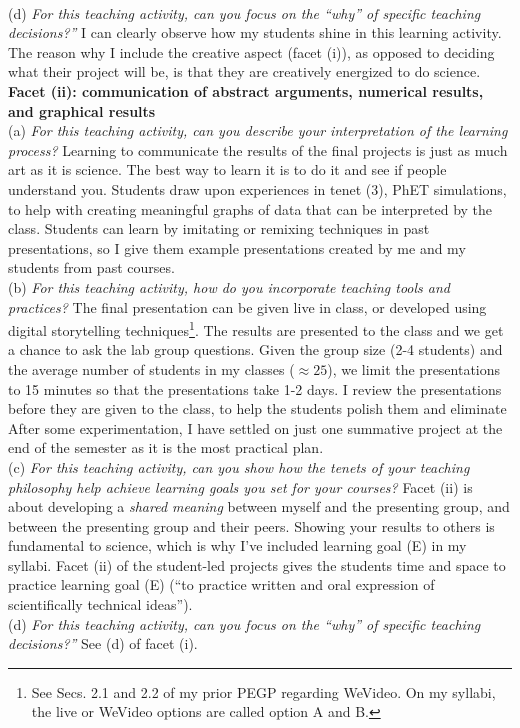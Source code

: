 \documentclass[../../../main.tex]{subfiles}
\begin{document}
\\
\vspace{0.15cm}
(d) \textit{For this teaching activity, can you focus on the ``why'' of specific teaching decisions?''}  I can clearly observe how my students shine in this learning activity.  The reason why I include the creative aspect (facet (i)), as opposed to deciding what their project will be, is that they are creatively energized to do science.
\\
\vspace{0.15cm}
\textbf{Facet (ii): communication of abstract arguments, numerical results, and graphical results}
\\
\vspace{0.15cm}
(a) \textit{For this teaching activity, can you describe your interpretation of the learning process?}  Learning to communicate the results of the final projects is just as much art as it is science.  The best way to learn it is to do it and see if people understand you.  Students draw upon experiences in tenet (3), PhET simulations, to help with creating meaningful graphs of data that can be interpreted by the class.  Students can learn by imitating or remixing techniques in past presentations, so I give them example presentations created by me and my students from past courses.
\\
\vspace{0.15cm}
(b) \textit{For this teaching activity, how do you incorporate teaching tools and practices?}  The final presentation can be given live in class, or developed using digital storytelling techniques\footnote{See Secs. 2.1 and 2.2 of my prior PEGP regarding WeVideo.  On my syllabi, the live or WeVideo options are called option A and B.}.  The results are presented to the class and we get a chance to ask the lab group questions.  Given the group size (2-4 students) and the average number of students in my classes ($\approx 25$), we limit the presentations to 15 minutes so that the presentations take 1-2 days.  I review the presentations before they are given to the class, to help the students polish them and eliminate   After some experimentation, I have settled on just one summative project at the end of the semester as it is the most practical plan.
\\
\vspace{0.15cm}
(c) \textit{For this teaching activity, can you show how the tenets of your teaching philosophy help achieve learning goals you set for your courses?}  Facet (ii) is about developing a \textit{shared meaning} between myself and the presenting group, and between the presenting group and their peers.  Showing your results to others is fundamental to science, which is why I've included learning goal (E) in my syllabi.  Facet (ii) of the student-led projects gives the students time and space to practice learning goal (E) (``to practice written and oral expression of scientifically technical ideas'').
\\
\vspace{0.15cm}
(d) \textit{For this teaching activity, can you focus on the ``why'' of specific teaching decisions?''}  See (d) of facet (i).
\end{document}

